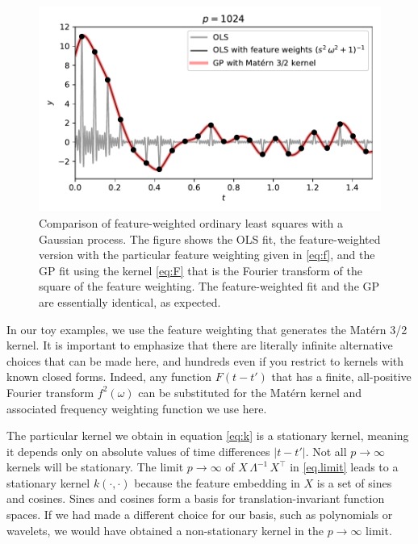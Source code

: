 \documentclass[12pt,letterpaper]{article}
\newlength{\figurewidth}
\begin{document}
\begin{figure}[t]
    \begin{mdframed}
    \includegraphics[width=\figurewidth]{paper/GP.pdf}
    \caption{Comparison of feature-weighted ordinary least squares with a Gaussian process. The figure shows the OLS fit, the feature-weighted version with the particular feature weighting given in \eqref{eq:f}, and the GP fit using the kernel \eqref{eq:F} that is the Fourier transform of the square of the feature weighting. The feature-weighted fit and the GP are essentially identical, as expected.}
    \label{fig:gp}
    \end{mdframed}
\end{figure}

In our toy examples, we use the feature weighting that generates the Mat\'ern 3/2 kernel.
It is important to emphasize that there are literally infinite alternative choices that can be made here, and hundreds even if you restrict to kernels with known closed forms.
Indeed, any function $F(t-t')$ that has a finite, all-positive Fourier transform $f^2(\omega)$ can be substituted for the Mat\'ern kernel and associated frequency weighting function we use here.

The particular kernel we obtain in equation \eqref{eq:k} is a stationary kernel, meaning it depends only on absolute values of time differences $|t - t'|$. Not all $p\rightarrow\infty$ kernels will be stationary. The limit $p\rightarrow\infty$ of $X\,\Lambda^{-1}\,X^\top$ in \eqref{eq.limit} leads to a stationary kernel $k(\cdot,\cdot)$ because the feature embedding in $X$ is a set of sines and cosines.
Sines and cosines form a basis for translation-invariant function spaces.
If we had made a different choice for our basis, such as polynomials or wavelets, we would have obtained a non-stationary kernel in the $p\rightarrow\infty$ limit.
\end{document}
